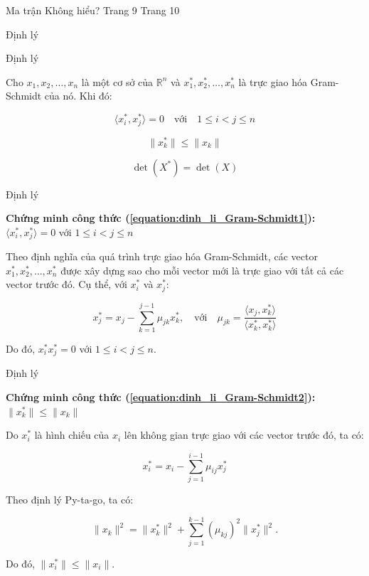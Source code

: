 \documentclass{beamer}
\numberwithin{equation}{section}
\begin{document}
\begin{frame}{Ma trận}
Không hiểu?
Trang 9
Trang 10

\end{frame}
\begin{frame}{Định lý}

\begin{block}{Định lý}

Cho $x_1, x_2, \ldots, x_n$ là một cơ sở của $\mathbb{R}^n$
và $x_1^*, x_2^*, \ldots, x_n^*$ là trực giao hóa Gram-Schmidt của nó. Khi đó:

\begin{equation} \label{equation:dinh_li_Gram-Schmidt1}
\langle x_i^*, x_j^* \rangle = 0 \quad \text{với} \quad 1 \leq i < j \leq n
\end{equation}

\begin{equation} \label{equation:dinh_li_Gram-Schmidt2}
\|x_k^*\| \leq \|x_k\|
\end{equation}

\begin{equation} \label{equation:dinh_li_Gram-Schmidt3}
\det(X^*) = \det(X)
\end{equation}

\end{block}

\end{frame}
\begin{frame}{Định lý}

\textbf{Chứng minh công thức (\ref{equation:dinh_li_Gram-Schmidt1}):}
$\langle x_i^*, x_j^* \rangle = 0$ với $1 \leq i < j \leq n$

Theo định nghĩa của quá trình trực giao hóa Gram-Schmidt,
các vector $x_1^*, x_2^*, \ldots, x_n^*$ được xây dựng sao cho
mỗi vector mới là trực giao với tất cả các vector trước đó.
Cụ thể, với $x_i^*$ và $x_j^*$:

\[
x_j^* = x_j - \sum_{k=1}^{j-1} \mu_{jk} x_k^*, \quad \text{với} \quad \mu_{jk} = \frac{\langle x_j, x_k^* \rangle}{\langle x_k^*, x_k^* \rangle}
\]

Do đó, $ x_i^* x_j^* = 0$ với $1 \leq i < j \leq n$.

\end{frame}
\begin{frame}{Định lý}

\textbf{Chứng minh công thức (\ref{equation:dinh_li_Gram-Schmidt2}):}
$\|x_k^*\| \leq \|x_k\|$

Do $x_i^*$ là hình chiếu của $x_i$ lên không gian trực giao với các vector trước đó, ta có:

\[
x_i^* = x_i - \sum_{j=1}^{i-1} \mu_{ij} x_j^*
\]

Theo định lý Py-ta-go, ta có:

\[
\|x_k\|^2 = \|x_k^*\|^2 + \sum_{j=1}^{k-1} (\mu_{kj})^2 \|x_j^*\|^2.
\]

Do đó, $\|x_i^*\| \leq \|x_i\|$.

\end{frame}
\end{document}
